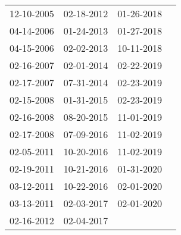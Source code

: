 \begin{supertabular}{llll}
 12-10-2005 &  02-18-2012 &  01-26-2018 \\
 04-14-2006 &  01-24-2013 &  01-27-2018 \\
 04-15-2006 &  02-02-2013 &  10-11-2018 \\
 02-16-2007 &  02-01-2014 &  02-22-2019 \\
 02-17-2007 &  07-31-2014 &  02-23-2019 \\
 02-15-2008 &  01-31-2015 &  02-23-2019 \\
 02-16-2008 &  08-20-2015 &  11-01-2019 \\
 02-17-2008 &  07-09-2016 &  11-02-2019 \\
 02-05-2011 &  10-20-2016 &  11-02-2019 \\
 02-19-2011 &  10-21-2016 &  01-31-2020 \\
 03-12-2011 &  10-22-2016 &  02-01-2020 \\
 03-13-2011 &  02-03-2017 &  02-01-2020 \\
 02-16-2012 &  02-04-2017 &             \\
\end{supertabular}

